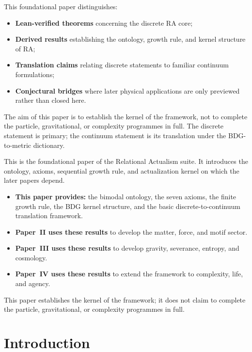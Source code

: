 \documentclass[11pt]{article}
\begin{document}
\begin{tcolorbox}[title=Epistemic Status of This Paper,colback=gray!5,colframe=gray!60]
This foundational paper distinguishes:
\begin{itemize}[nosep]
    \item \textbf{Lean-verified theorems} concerning the discrete RA core;
    \item \textbf{Derived results} establishing the ontology, growth rule, and kernel structure of RA;
    \item \textbf{Translation claims} relating discrete statements to familiar continuum formulations;
    \item \textbf{Conjectural bridges} where later physical applications are only previewed rather than closed here.
\end{itemize}
The aim of this paper is to establish the kernel of the framework, not to complete the particle, gravitational, or complexity programmes in full. The discrete statement is primary; the continuum statement is its translation under the BDG-to-metric dictionary.
\end{tcolorbox}

\begin{tcolorbox}[title=Place of This Paper in the RA Suite,colback=gray!5,colframe=gray!60]
This is the foundational paper of the Relational Actualism suite. It introduces the ontology, axioms, sequential growth rule, and actualization kernel on which the later papers depend.
\begin{itemize}[nosep]
    \item \textbf{This paper provides:} the bimodal ontology, the seven axioms, the finite growth rule, the BDG kernel structure, and the basic discrete-to-continuum translation framework.
    \item \textbf{Paper~II uses these results} to develop the matter, force, and motif sector.
    \item \textbf{Paper~III uses these results} to develop gravity, severance, entropy, and cosmology.
    \item \textbf{Paper~IV uses these results} to extend the framework to complexity, life, and agency.
\end{itemize}
This paper establishes the kernel of the framework; it does not claim to complete the particle, gravitational, or complexity programmes in full.
\end{tcolorbox}

\section{Introduction}
\end{document}
